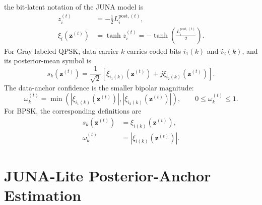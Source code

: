 \documentclass[conference]{IEEEtran}
\begin{document}
the bit-latent notation of the JUNA model is
\begin{align}
  z_i^{(t)}
  &=
  -\frac{1}{2}L_i^{\mathrm{post},(t)},
  \label{eq:posterior-latent}\\
  \xi_i(\mathbf z^{(t)})
  &=
  \tanh z_i^{(t)}
  =
  -\tanh\!\left(\frac{L_i^{\mathrm{post},(t)}}{2}\right).
  \label{eq:posterior-bit}
\end{align}
For Gray-labeled QPSK, data carrier \(k\) carries coded bits \(i_1(k)\) and
\(i_2(k)\), and its posterior-mean symbol is
\begin{equation}
  s_k(\mathbf z^{(t)})
  =
  \frac{1}{\sqrt 2}
  \left[
  \xi_{i_1(k)}(\mathbf z^{(t)})
  +
  j\xi_{i_2(k)}(\mathbf z^{(t)})
  \right].
  \label{eq:posterior-symbol}
\end{equation}
The data-anchor confidence is the smaller bipolar magnitude:
\begin{equation}
  \omega_k^{(t)}
  =
  \min\!\left(
  \left|\xi_{i_1(k)}(\mathbf z^{(t)})\right|,
  \left|\xi_{i_2(k)}(\mathbf z^{(t)})\right|
  \right),
  \qquad 0\leq\omega_k^{(t)}\leq1.
  \label{eq:confidence}
\end{equation}
For BPSK, the corresponding definitions are
\begin{align}
  s_k(\mathbf z^{(t)})
  &=
  \xi_{i(k)}(\mathbf z^{(t)}),
  \label{eq:bpsk-symbol}\\
  \omega_k^{(t)}
  &=
  \left|\xi_{i(k)}(\mathbf z^{(t)})\right|.
  \label{eq:bpsk-confidence}
\end{align}

\section{JUNA-Lite Posterior-Anchor Estimation}
\end{document}
